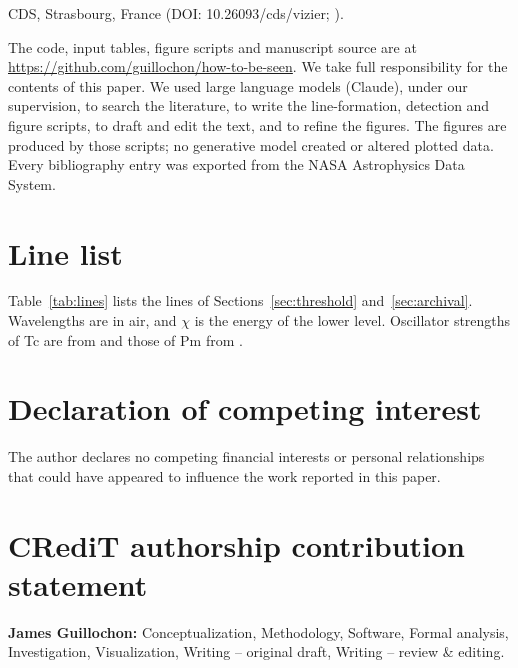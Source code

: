 \documentclass[final,5p]{elsarticle}
\begin{document}
\begin{acknowledgments}
CDS, Strasbourg, France (DOI: 10.26093/cds/vizier; \citealt{Ochsenbein2000}).

The code, input tables, figure scripts and manuscript source are at \url{https://github.com/guillochon/how-to-be-seen}. We take full responsibility for the contents of this paper. We used large language models (Claude), under our supervision, to search the literature, to write the line-formation, detection and figure scripts, to draft and edit the text, and to refine the figures. The figures are produced by those scripts; no generative model created or altered plotted data. Every bibliography entry was exported from the NASA Astrophysics Data System.
\end{acknowledgments}

\appendix

\section{Line list}
\label{app:lines}

Table~\ref{tab:lines} lists the lines of Sections~\ref{sec:threshold} and~\ref{sec:archival}. Wavelengths are in air, and $\chi$ is the energy of the lower level. Oscillator strengths of Tc are from \citet{Kurucz2011} and those of Pm from \citet{Fivet2007}.

\begin{table}
\centering
\caption{Lines used. t: in the detection statistic of Section~\ref{sec:threshold}. a: sets the archival limit of at least one star (Section~\ref{sec:archival}).}
\label{tab:lines}
\footnotesize
\setlength{\tabcolsep}{3pt}
\iftwocol\else\scriptsize\resizebox{\textwidth}{!}{}\fi
\end{table}


\section*{Declaration of competing interest}
The author declares no competing financial interests or personal relationships that could have appeared to influence the work reported in this paper.

\section*{CRediT authorship contribution statement}
\textbf{James Guillochon:} Conceptualization, Methodology, Software, Formal analysis, Investigation, Visualization, Writing -- original draft, Writing -- review \& editing.
\end{document}
